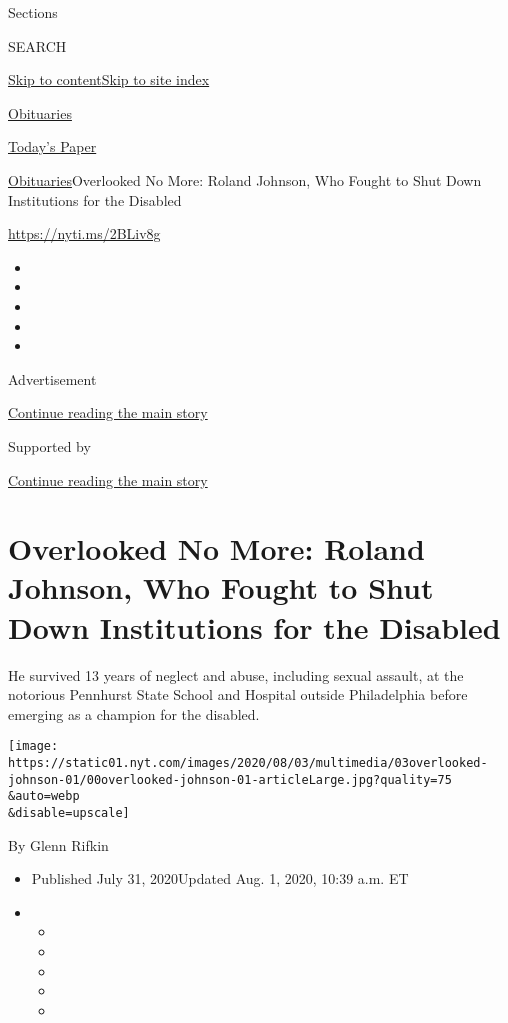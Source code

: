 Sections

SEARCH

\protect\hyperlink{site-content}{Skip to
content}\protect\hyperlink{site-index}{Skip to site index}

\href{https://www.nytimes.com/section/obituaries}{Obituaries}

\href{https://myaccount.nytimes.com/auth/login?response_type=cookie\&client_id=vi}{}

\href{https://www.nytimes.com/section/todayspaper}{Today's Paper}

\href{/section/obituaries}{Obituaries}\textbar{}Overlooked No More:
Roland Johnson, Who Fought to Shut Down Institutions for the Disabled

\url{https://nyti.ms/2BLiv8g}

\begin{itemize}
\item
\item
\item
\item
\item
\end{itemize}

Advertisement

\protect\hyperlink{after-top}{Continue reading the main story}

Supported by

\protect\hyperlink{after-sponsor}{Continue reading the main story}

\hypertarget{overlooked-no-more-roland-johnson-who-fought-to-shut-down-institutions-for-the-disabled}{%
\section{Overlooked No More: Roland Johnson, Who Fought to Shut Down
Institutions for the
Disabled}\label{overlooked-no-more-roland-johnson-who-fought-to-shut-down-institutions-for-the-disabled}}

He survived 13 years of neglect and abuse, including sexual assault, at
the notorious Pennhurst State School and Hospital outside Philadelphia
before emerging as a champion for the disabled.

\texttt{[image: https://static01.nyt.com/images/2020/08/03/multimedia/03overlooked-johnson-01/00overlooked-johnson-01-articleLarge.jpg?quality=75\\\&auto=webp\\\&disable=upscale]}

By Glenn Rifkin

\begin{itemize}
\item
  Published July 31, 2020Updated Aug. 1, 2020, 10:39 a.m. ET
\item
  \begin{itemize}
  \item
  \item
  \item
  \item
  \item
  \end{itemize}
\end{itemize}

